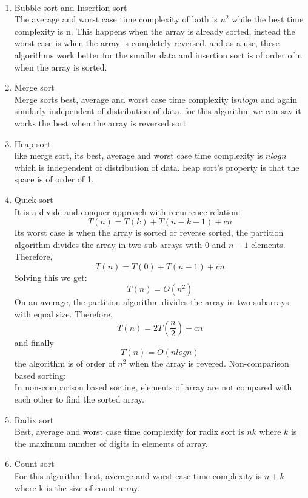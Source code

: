 \documentclass[
10pt, %
a4paper, %
oneside, %
headinclude,footinclude, %
BCOR5mm, %
]{scrartcl}
\begin{document}
\paragraph{}  
\begin{enumerate}[noitemsep]
\item  Bubble sort and Insertion sort
\\
The average and worst case time complexity of both is $n^2 $ while the best time complexity is n. This happens when the array is already sorted, instead the worst case is when the array is completely reversed. 
and as a use, these algorithms work better for the smaller data and insertion sort is of order of n when the array is sorted.


\item Merge sort
\\
Merge sorts best, average and worst case time complexity is$nlogn$ and again similarly independent of distribution of data. for this algorithm we can say it works the best when the array is reversed sort

\item Heap sort
\\
like merge sort, its best, average and worst case time complexity is $nlogn$ which is independent of distribution of data. 
heap sort's property is that the space is of order of 1.
\item Quick sort
\\
It is a divide and conquer approach with recurrence relation: 
$$T(n) = T(k) + T(n-k-1) + cn$$
Its worst case is when the array is sorted or reverse sorted, the partition algorithm divides the array in two sub arrays with $0$ and $n-1$ elements. Therefore, 
$$T(n) = T(0) + T(n-1) + cn$$
Solving this we get:
$$T(n) = O(n^2)$$
On an average, the partition algorithm divides the array in two subarrays with
 equal size. Therefore,
$$T(n) = 2T(\frac{n}{2}) + cn$$
and finally
$$T(n) = O(nlogn)$$
the algorithm is of order of $n^2$ when the array is revered.
Non-comparison based sorting:
\\
In non-comparison based sorting, elements of array are not compared with each other to find the sorted array.
\\

\item Radix sort
\\
Best, average and worst case time complexity for radix sort is $nk$ where $k$ is the maximum number of digits in elements of array. 
\\

\item Count sort
\\
For this algorithm best, average and worst case time complexity is $n+k$ where k is the size of count array.



\end{enumerate}
\end{document}
